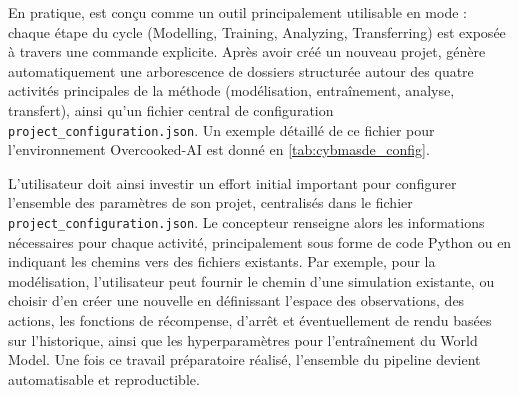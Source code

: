 En pratique,  est conçu comme un outil principalement utilisable en mode  : chaque étape du cycle  (Modelling, Training, Analyzing, Transferring) est exposée à travers une commande explicite.
%
Après avoir créé un nouveau projet,  génère automatiquement une arborescence de dossiers structurée autour des quatre activités principales de la méthode  (modélisation, entraînement, analyse, transfert), ainsi qu'un fichier central de configuration \texttt{project\_configuration.json}. Un exemple détaillé de ce fichier pour l'environnement Overcooked-AI est donné en \autoref{tab:cybmasde_config}.



L’utilisateur doit ainsi investir un effort initial important pour configurer l’ensemble des paramètres de son projet, centralisés dans le fichier \texttt{project\_configuration.json}.
Le concepteur renseigne alors les informations nécessaires pour chaque activité, principalement sous forme de code Python ou en indiquant les chemins vers des fichiers existants. Par exemple, pour la modélisation, l'utilisateur peut fournir le chemin d'une simulation existante, ou choisir d'en créer une nouvelle en définissant l'espace des observations, des actions, les fonctions de récompense, d'arrêt et éventuellement de rendu basées sur l'historique, ainsi que les hyperparamètres pour l'entraînement du World Model.
Une fois ce travail préparatoire réalisé, l’ensemble du pipeline devient automatisable et reproductible.

\medskip


